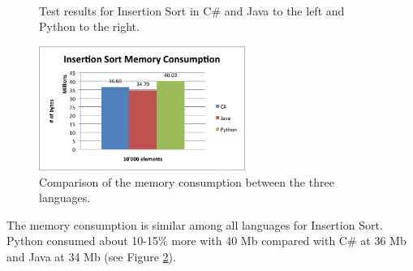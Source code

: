 \begin{figure}[h]
	\centering
	\mbox{
	}
	\caption{Test results for Insertion Sort in C\# and Java to the left and Python to the right.}
	\label{fig:insertion_sort_graphs}
\end{figure}

\begin{figure}[h]
	\centering
	\includegraphics[width=0.6\textwidth]{chapters/media/insertion_sort_memory.png}
	\caption{Comparison of the memory consumption between the three languages.}
	\label{fig:insertion_sort_memory}
\end{figure}

The memory consumption is similar among all languages for Insertion Sort. Python consumed about 10-15\% more with 40 Mb compared with C\# at 36 Mb and Java at 34 Mb (see Figure \ref{fig:insertion_sort_memory}).




















